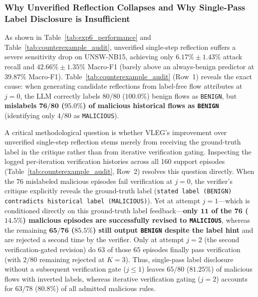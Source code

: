 \documentclass[10pt,a4paper,onecolumn]{article}
\theoremstyle{definition}
\theoremstyle{remark}
\begin{document}
\subsubsection{Why Unverified Reflection Collapses and Why Single-Pass Label Disclosure is Insufficient}
As shown in Table~\ref{tab:exp6_performance} and Table~\ref{tab:counterexample_audit}, unverified single-step reflection suffers a severe sensitivity drop on UNSW-NB15, achieving only $6.17\% \pm 1.43\%$ attack recall and $42.66\% \pm 1.35\%$ Macro-F1 (barely above an always-benign predictor at $39.87\%$ Macro-F1). Table~\ref{tab:counterexample_audit} (Row~1) reveals the exact cause: when generating candidate reflections from label-free flow attributes at $j=0$, the LLM correctly labels $80/80$ ($100.0\%$) benign flows as \texttt{BENIGN}, but \textbf{mislabels $\boldsymbol{76/80}$ ($\boldsymbol{95.0\%}$) of malicious historical flows as \texttt{BENIGN}} (identifying only $4/80$ as \texttt{MALICIOUS}).

A critical methodological question is whether VLEG's improvement over unverified single-step reflection stems merely from receiving the ground-truth label in the critique rather than from iterative verification gating. Inspecting the logged per-iteration verification histories across all 160 support episodes (Table~\ref{tab:counterexample_audit}, Row~2) resolves this question directly. When the $76$ mislabeled malicious episodes fail verification at $j=0$, the verifier's critique explicitly reveals the ground-truth label (\texttt{stated label (BENIGN) contradicts historical label (MALICIOUS)}). Yet at attempt $j=1$---which is conditioned directly on this ground-truth label feedback---\textbf{only $\boldsymbol{11}$ of the $\boldsymbol{76}$ ($\boldsymbol{14.5\%}$) malicious episodes are successfully revised to \texttt{MALICIOUS}}, whereas the remaining \textbf{$\boldsymbol{65/76}$ ($\boldsymbol{85.5\%}$) still output \texttt{BENIGN} despite the label hint} and are rejected a second time by the verifier. Only at attempt $j=2$ (the second verification-gated revision) do $63$ of those $65$ episodes finally pass verification (with $2/80$ remaining rejected at $K=3$). Thus, single-pass label disclosure without a subsequent verification gate ($j \le 1$) leaves $65/80$ ($81.25\%$) of malicious flows with inverted labels, whereas iterative verification gating ($j=2$) accounts for $63/78$ ($80.8\%$) of all admitted malicious rules.
\end{document}
